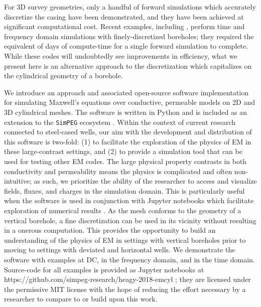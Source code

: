 For 3D survey geometries, only a handful of forward simulations which accurately discretize the casing have been demonstrated, and they have been achieved at significant computational cost. Recent examples, including \cite{Commer2015, Um2015, Puzyrev2017}, perform time and frequency domain simulations with finely-discretized boreholes; they required the equivalent of days of compute-time for a single forward simulation to complete. While these codes will undoubtedly see improvements in efficiency, what we present here is an alternative approach to the discretization which capitalizes on the cylindrical geometry of a borehole.

We introduce an approach and associated open-source software implementation for simulating Maxwell’s equations over conductive, permeable models on 2D and 3D cylindrical meshes. The software is written in Python \citep{van1995python} and is included as an extension to the \texttt{SimPEG} ecosystem \citep{Cockett2015, Heagy2017}. Within the context of current research connected to steel-cased wells, our aim with the development and distribution of this software is two-fold: (1) to facilitate the exploration of the physics of EM in these large-contrast settings, and (2) to provide a simulation tool that can be used for testing other EM codes. The large physical property contrasts in both conductivity and permeability means the physics is complicated and often non-intuitive; as such, we prioritize the ability of the researcher to access and visualize fields, fluxes, and charges in the simulation domain. This is particularly useful when the software is used in conjunction with Jupyter notebooks which facilitate exploration of numerical results \citep{Perez2015}. As the mesh conforms to the geometry of a vertical borehole, a fine discretization can be used in its vicinity without resulting in a onerous computation. This provides the opportunity to build an understanding of the physics of EM in settings with vertical boreholes prior to moving to settings with deviated and horizontal wells. We demonstrate the software with examples at DC, in the frequency domain, and in the time domain. Source-code for all examples is provided as Jupyter notebooks at https://github.com/simpeg-research/heagy-2018-emcyl \citep{Heagy2018}; they are licensed under the permissive MIT license with the hope of reducing the effort necessary by a researcher to compare to or build upon this work.

